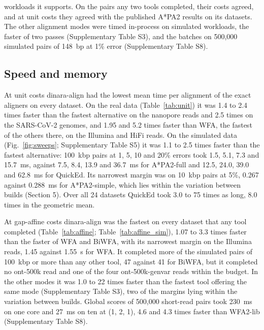 \documentclass[nocrop,noinfo]{bioinfo}
\begin{document}
workloads it supports. On the pairs any two tools completed, their costs agreed, and at unit costs they agreed with the published A*PA2 results on its datasets. The other alignment modes were timed in-process on simulated workloads, the faster of two passes (Supplementary Table S3), and the batches on 500{,}000 simulated pairs of 148~bp at 1\% error (Supplementary Table S8).

\subsection{Speed and memory}

At unit costs dinara-align had the lowest mean time per alignment of the exact aligners on every dataset. On the real data (Table~\ref{tab:unit}) it was 1.4 to 2.4 times faster than the fastest alternative on the nanopore reads and 2.5 times on the SARS-CoV-2 genomes, and 1.95 and 5.2 times faster than WFA, the fastest of the others there, on the Illumina and HiFi reads. On the simulated data (Fig.~\ref{fig:sweeps}; Supplementary Table S5) it was 1.1 to 2.5 times faster than the fastest alternative: 100~kbp pairs at 1, 5, 10 and 20\% errors took 1.5, 5.1, 7.3 and 15.7~ms, against 7.5, 8.4, 13.9 and 36.7~ms for A*PA2-full and 12.5, 24.0, 39.0 and 62.8~ms for QuickEd. Its narrowest margin was on 10~kbp pairs at 5\%, 0.267 against 0.288~ms for A*PA2-simple, which lies within the variation between builds (Section 5). Over all 24 datasets QuickEd took 3.0 to 75 times as long, 8.0 times in the geometric mean.

At gap-affine costs dinara-align was the fastest on every dataset that any tool completed (Table~\ref{tab:affine}; Table~\ref{tab:affine_sim}), 1.07 to 3.3 times faster than the faster of WFA and BiWFA, with its narrowest margin on the Illumina reads, 1.45 against 1.55~\textmu s for WFA. It completed more of the simulated pairs of 100~kbp or more than any other tool, 47 against 41 for BiWFA, but it completed no ont-500k read and one of the four ont-500k-genvar reads within the budget. In the other modes it was 1.0 to 22 times faster than the fastest tool offering the same mode (Supplementary Table S3), two of the margins lying within the variation between builds. Global scores of 500{,}000 short-read pairs took 230~ms on one core and 27~ms on ten at (1, 2, 1), 4.6 and 4.3 times faster than WFA2-lib (Supplementary Table S8).
\end{document}
